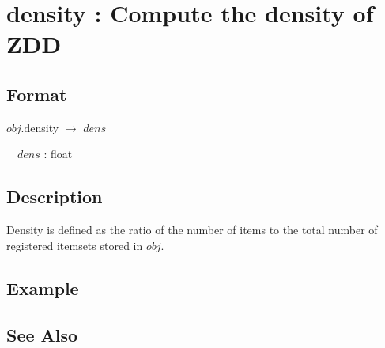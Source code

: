 
\section{density : Compute the density of ZDD\label{sect:density}}
\subsection*{Format}
$obj$.density $\rightarrow$ $dens$

~~$dens$ : float

\subsection*{Description}

Density is defined as the ratio of the number of items to the total number of registered itemsets stored in $obj$.

\subsection*{Example}


\subsection*{See Also}

